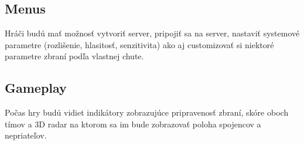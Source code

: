 \documentclass[a4paper]{report}
\begin{document}
\subsection{Menus}
Hráči budú mať možnosť vytvoriť server, pripojiť sa na server, nastaviť systemové parametre (rozlišenie, hlasitosť, senzitivita) ako aj customizovať si niektoré parametre zbraní podľa vlastnej chute.
 
\subsection{Gameplay}
Počas hry budú vidiet indikátory zobrazujúce pripravenosť zbraní, skóre oboch tímov a 3D radar na ktorom sa im bude zobrazovať poloha spojencov a nepriateľov.
 
\end{document}
